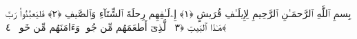 
  
    
  
    
    

\nopagebreak
  بِسمِ ٱللَّهِ ٱلرَّحمَـٰنِ ٱلرَّحِيمِ
  لِإِيلَـٰفِ قُرَيشٍ ﴿١﴾
 إِۦلَـٰفِهِم رِحلَةَ ٱلشِّتَآءِ وَٱلصَّيفِ ﴿٢﴾
 فَليَعبُدُوا۟ رَبَّ هَـٰذَا ٱلبَيتِ ﴿٣﴾
 ٱلَّذِىٓ أَطعَمَهُم مِّن جُوعٍۢ وَءَامَنَهُم مِّن خَوفٍۭ ﴿٤﴾
 

